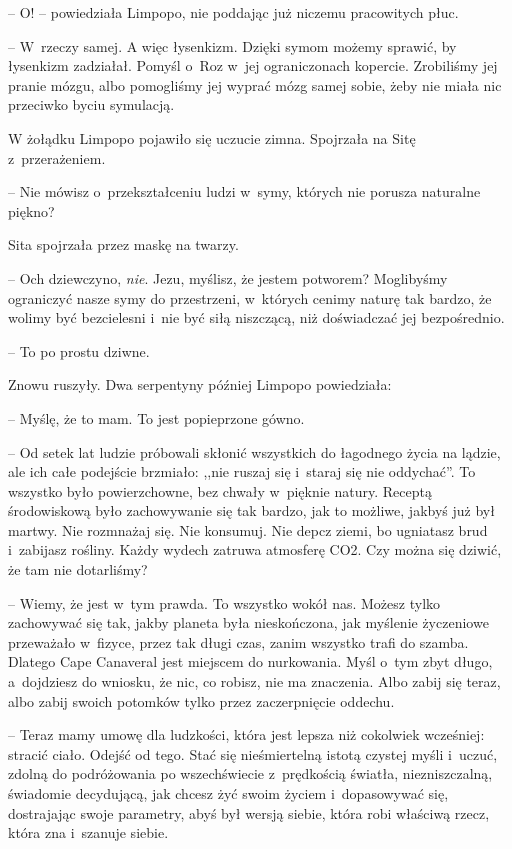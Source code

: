 \documentclass[oneside,polish,11pt,sfheadings]{mwbk}
\begin{document}
-- O! -- powiedziała Limpopo, nie poddając już niczemu pracowitych płuc.

-- W~rzeczy samej. A więc łysenkizm. Dzięki symom możemy sprawić, by
łysenkizm zadziałał. Pomyśl o~Roz w~jej ograniczonach kopercie.
Zrobiliśmy jej pranie mózgu, albo pomogliśmy jej wyprać mózg samej
sobie, żeby nie miała nic przeciwko byciu symulacją.

W żołądku Limpopo pojawiło się uczucie zimna. Spojrzała na Sitę z~przerażeniem. 

-- Nie mówisz o~przekształceniu ludzi w~symy, których nie
porusza naturalne piękno?

Sita spojrzała przez maskę na twarzy. 

-- Och dziewczyno, \textit{nie}.
Jezu, myślisz, że jestem potworem? Moglibyśmy ograniczyć nasze symy do
przestrzeni, w~których cenimy naturę tak bardzo, że wolimy być
bezcielesni i~nie być siłą niszczącą, niż doświadczać jej bezpośrednio.

-- To po prostu dziwne.

Znowu ruszyły. Dwa serpentyny później Limpopo powiedziała: 

-- Myślę, że
to mam. To jest popieprzone gówno.

-- Od setek lat ludzie próbowali skłonić wszystkich do łagodnego życia na
lądzie, ale ich całe podejście brzmiało: ,,nie ruszaj się i~staraj się
nie oddychać''. To wszystko było powierzchowne, bez chwały w~pięknie
natury. Receptą środowiskową było zachowywanie się tak bardzo, jak to
możliwe, jakbyś już był martwy. Nie rozmnażaj się. Nie konsumuj. Nie
depcz ziemi, bo ugniatasz brud i~zabijasz rośliny. Każdy wydech zatruwa
atmosferę CO2. Czy można się dziwić, że tam nie dotarliśmy?

-- Wiemy, że jest w~tym prawda. To wszystko wokół nas. Możesz tylko
zachowywać się tak, jakby planeta była nieskończona, jak myślenie
życzeniowe przeważało w~fizyce, przez tak długi czas, zanim wszystko
trafi do szamba. Dlatego Cape Canaveral jest miejscem do nurkowania.
Myśl o~tym zbyt długo, a~dojdziesz do wniosku, że nic, co robisz, nie ma
znaczenia. Albo zabij się teraz, albo zabij swoich potomków tylko przez
zaczerpnięcie oddechu.

-- Teraz mamy umowę dla ludzkości, która jest lepsza niż cokolwiek
wcześniej: stracić ciało. Odejść od tego. Stać się nieśmiertelną istotą
czystej myśli i~uczuć, zdolną do podróżowania po wszechświecie z~prędkością światła, niezniszczalną, świadomie decydującą, jak chcesz żyć
swoim życiem i~dopasowywać się, dostrajając swoje parametry, abyś był
wersją siebie, która robi właściwą rzecz, która zna i~szanuje siebie.
\end{document}
